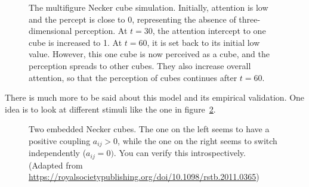 \documentclass[
  a4paper,
  DIV=11,
  numbers=noendperiod,
  oneside]{scrreprt}
\begin{document}
\begin{figure}


\caption{\label{fig-ch4n-img19-old-67}The multifigure Necker cube
simulation. Initially, attention is low and the percept is close to 0,
representing the absence of three-dimensional perception. At \(t = 30\),
the attention intercept to one cube is increased to 1. At \(t = 60\), it
is set back to its initial low value. However, this one cube is now
perceived as a cube, and the perception spreads to other cubes. They
also increase overall attention, so that the perception of cubes
continues after \(t = 60\).}

\end{figure}%

There is much more to be said about this model and its empirical
validation. One idea is to look at different stimuli like the one in
figure~\ref{fig-ch4n-img20-old-68}.

\begin{figure}


\caption{\label{fig-ch4n-img20-old-68}Two embedded Necker cubes. The one
on the left seems to have a positive coupling \(a_{ij} > 0\), while the
one on the right seems to switch independently (\(a_{ij} = 0)\). You can
verify this introspectively. (Adapted from
\url{https://royalsocietypublishing.org/doi/10.1098/rstb.2011.0365})}

\end{figure}%
\end{document}
